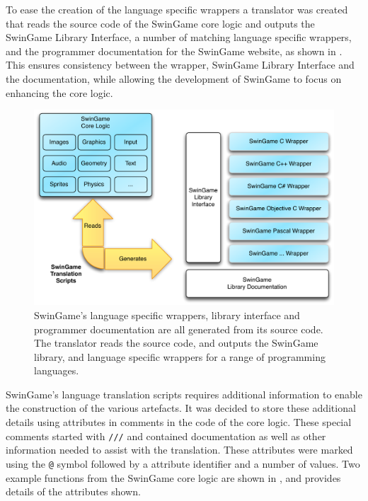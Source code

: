 To ease the creation of the language specific wrappers a translator was created that reads the source code of the SwinGame core logic and outputs the SwinGame Library Interface, a number of matching language specific wrappers, and the programmer documentation for the SwinGame website, as shown in . This ensures consistency between the wrapper, SwinGame Library Interface and the documentation, while allowing the development of SwinGame to focus on enhancing the core logic.

\begin{figure}[thbp]
  \centering
  \includegraphics[width=\textwidth]{SwinGameTranslator}
  \caption{SwinGame's language specific wrappers, library interface and programmer documentation are all generated from its source code. The translator reads the source code, and outputs the SwinGame library, and language specific wrappers for a range of programming languages.}
  \label{fig:swingame_trans}
\end{figure}

SwinGame's language translation scripts requires additional information to enable the construction of the various artefacts. It was decided to store these additional details using attributes in comments in the code of the core logic. These special comments started with \texttt{///} and contained documentation as well as other information needed to assist with the translation. These attributes were marked using the \texttt{@} symbol followed by a attribute identifier and a number of values. Two example functions from the SwinGame core logic are shown in , and  provides details of the attributes shown.


